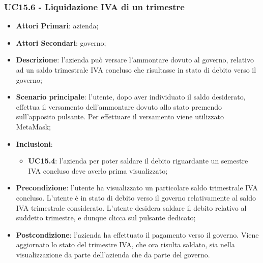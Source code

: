 \subsubsection{UC15.6 - Liquidazione IVA di un trimestre}
\begin{itemize}
	\item \textbf{Attori Primari}: azienda;
	\item \textbf{Attori Secondari}: governo;
	\item \textbf{Descrizione}: l'azienda può versare l'ammontare dovuto al governo, relativo ad un saldo trimestrale IVA concluso che risultasse in stato di debito verso il governo;
	\item \textbf{Scenario principale}: l'utente, dopo aver individuato il saldo desiderato, effettua il versamento dell'ammontare dovuto allo stato premendo sull'apposito pulsante. Per effettuare il versamento viene utilizzato MetaMask\glo;
	\item \textbf{Inclusioni}:
	\begin{itemize}
		\item \textbf{UC15.4}: l'azienda per poter saldare il debito riguardante un semestre IVA concluso deve averlo prima visualizzato;
	\end{itemize}
	\item \textbf{Precondizione}: l'utente ha visualizzato un particolare saldo trimestrale IVA concluso. L'utente è in stato di debito verso il governo relativamente al saldo IVA trimestrale considerato. L'utente desidera saldare il debito relativo al suddetto trimestre, e dunque clicca sul pulsante dedicato;
	\item \textbf{Postcondizione}: l'azienda ha effettuato il pagamento verso il governo. Viene aggiornato lo stato del trimestre IVA, che ora risulta saldato, sia nella visualizzazione da parte dell'azienda che da parte del governo.
\end{itemize} 

